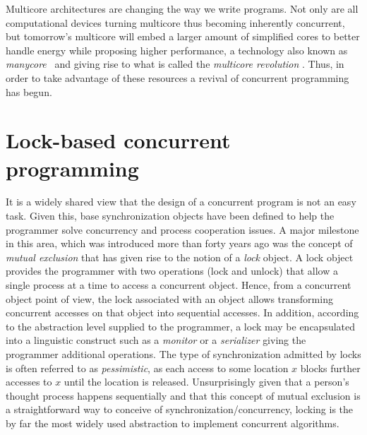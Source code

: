 







Multicore architectures are changing the way we write programs.
Not only are all computational devices
turning multicore thus becoming inherently concurrent, 
but tomorrow's multicore will embed a larger amount of simplified cores to better handle energy while 
proposing higher performance, a technology also known as \emph{manycore}~\cite{Borkar2007}
and giving rise to what is called the {\it multicore  
revolution} \cite{HL08}.
Thus, in order to take advantage of these resources a revival of concurrent programming has begun.


\section{Lock-based concurrent programming}\label{sec:intro-lockbased}
%
It is a widely shared view  that the design of a concurrent program is not an easy
task.
Given this, base synchronization objects have been defined to help 
the programmer solve  concurrency and process cooperation  issues. 
A  major milestone in this area, which was introduced 
more than forty years  ago was the concept of {\it mutual exclusion} \cite{D68}
that has given rise  to  the  notion of  a  {\it  lock} object.    
A lock object provides the programmer with two operations (lock and unlock)
that  allow a single process at a time to access a concurrent object. 
Hence, from a  concurrent object point of view,   the  lock associated with
an object allows transforming  concurrent  accesses on  that object  
into sequential accesses.
In addition, according to the abstraction level
supplied to the programmer,  a lock may be encapsulated into a linguistic 
construct such as a {\it monitor} \cite{H74} or a {\it serializer} \cite{HA79}
giving the programmer additional operations.
The type of synchronization admitted by locks is often referred to as \emph{pessimistic}, 
as each access to some location $x$ blocks further accesses to $x$ until the location is released.
Unsurprisingly given that
a person's thought process happens sequentially
and that this concept of mutual exclusion is a straightforward way to
conceive of synchronization/concurrency,
locking is the by far the most widely used abstraction to
implement concurrent algorithms.

